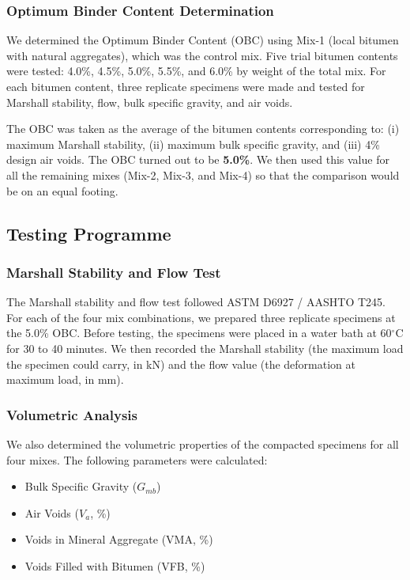 \documentclass[12pt,a4paper]{article}
\begin{document}
\subsubsection{Optimum Binder Content Determination}

We determined the Optimum Binder Content (OBC) using Mix-1 (local bitumen with natural aggregates), which was the control mix. Five trial bitumen contents were tested: 4.0\%, 4.5\%, 5.0\%, 5.5\%, and 6.0\% by weight of the total mix. For each bitumen content, three replicate specimens were made and tested for Marshall stability, flow, bulk specific gravity, and air voids.

The OBC was taken as the average of the bitumen contents corresponding to: (i) maximum Marshall stability, (ii) maximum bulk specific gravity, and (iii) 4\% design air voids. The OBC turned out to be \textbf{5.0\%}. We then used this value for all the remaining mixes (Mix-2, Mix-3, and Mix-4) so that the comparison would be on an equal footing.

\subsection{Testing Programme}

\subsubsection{Marshall Stability and Flow Test}

The Marshall stability and flow test followed ASTM D6927 / AASHTO T245. For each of the four mix combinations, we prepared three replicate specimens at the 5.0\% OBC. Before testing, the specimens were placed in a water bath at 60$^{\circ}$C for 30 to 40 minutes. We then recorded the Marshall stability (the maximum load the specimen could carry, in kN) and the flow value (the deformation at maximum load, in mm).

\subsubsection{Volumetric Analysis}

We also determined the volumetric properties of the compacted specimens for all four mixes. The following parameters were calculated:

\begin{itemize}
    \item Bulk Specific Gravity ($G_{mb}$)
    \item Air Voids ($V_a$, \%)
    \item Voids in Mineral Aggregate (VMA, \%)
    \item Voids Filled with Bitumen (VFB, \%)
\end{itemize}
\end{document}
